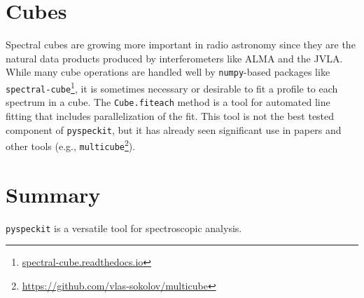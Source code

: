 \documentclass[twocolumn]{aastex61}
\newcommand{\pyspeckit}{\texttt{pyspeckit}\xspace}
\begin{document}
\section{Cubes}
Spectral cubes are growing more important in radio astronomy since they are the
natural data products produced by interferometers like ALMA and the JVLA.
While many cube operations are handled well by \texttt{numpy}-based packages
like \texttt{spectral-cube}\footnote{\url{spectral-cube.readthedocs.io}},
it is sometimes necessary or desirable to fit a profile to each spectrum
in a cube.  The \texttt{Cube.fiteach} method is a tool for automated line
fitting that includes parallelization of the fit.  This tool is not the best
tested component of \pyspeckit, but it has already seen significant use in
papers and other tools (e.g.,
\texttt{multicube}\footnote{\url{https://github.com/vlas-sokolov/multicube}}).

\section{Summary}
\texttt{pyspeckit} is a versatile tool for spectroscopic analysis.


\end{document}
